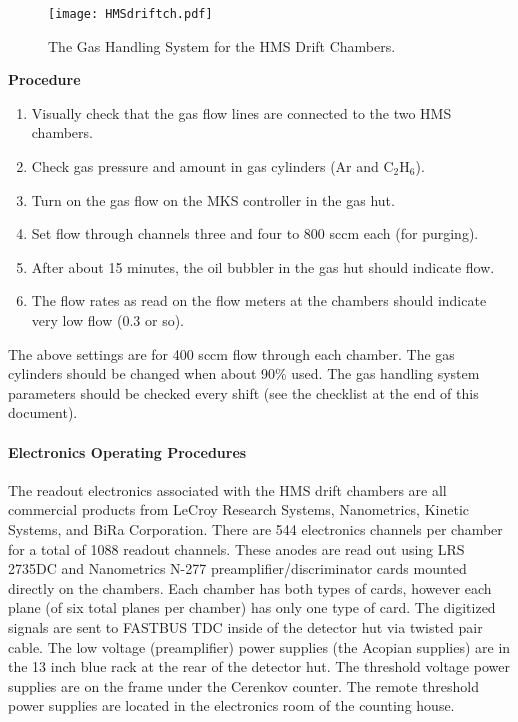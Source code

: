 \begin{figure}
\texttt{[image: HMSdriftch.pdf]}
\caption{The Gas Handling System for the HMS Drift Chambers. \label{fig:5.1}}
\end{figure}

\begin{center}
{\bf Procedure}
\end{center}

\begin{enumerate}
\item {Visually check that the gas flow lines are connected to the two
HMS chambers.}
\item {Check gas pressure and amount in gas cylinders (Ar and C$_2$H$_6$).}
\item {Turn on the gas flow on the MKS controller in the gas hut.}
\item {Set flow through channels three and four to 800 sccm each
(for purging).}
\item {After about 15 minutes, the oil bubbler in the gas hut should
indicate flow.}
\item {The flow rates as read on the flow meters at the chambers should
indicate very low flow (0.3 or so).}
\end{enumerate}

The above settings are for 400 sccm flow through each chamber.  The gas
cylinders should be changed when about 90\% used.  The gas handling system
parameters should be checked every shift (see the checklist at the end of
this document).

\paragraph{Electronics Operating Procedures}

The readout electronics associated with the HMS drift chambers are all
commercial products from LeCroy Research Systems, Nanometrics, Kinetic Systems,
and BiRa Corporation.  There are 544 electronics channels per chamber for
a total of 1088 readout channels.  These anodes are read out using LRS 2735DC
and Nanometrics N-277 preamplifier/discriminator cards mounted directly
on the chambers.  Each chamber has both types of cards, however each plane
(of six total planes per chamber) has only one type of card.  The
digitized signals are sent to FASTBUS TDC inside of the detector hut
via twisted pair cable.  The low voltage (preamplifier) power supplies
(the Acopian supplies)
are in the 13 inch blue rack at the rear of the detector hut.  The
threshold voltage power supplies are on the frame under the Cerenkov
counter.  The remote
threshold power supplies are located in the electronics room of the counting
house.

